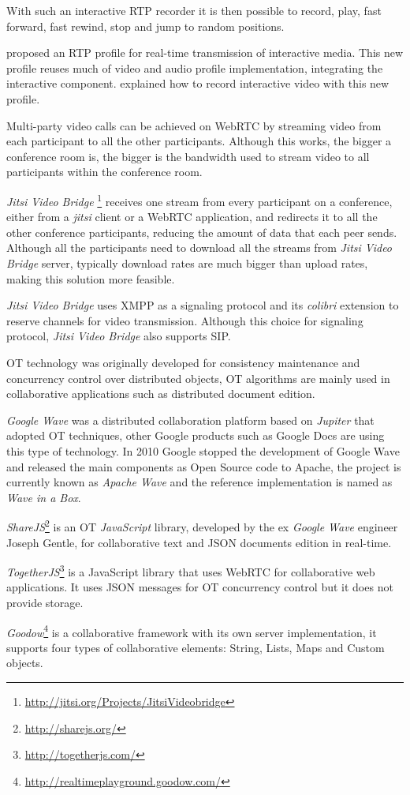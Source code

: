 	With such an interactive \ac{RTP} recorder it is then possible to record, play, fast forward, fast rewind, stop and jump to random positions.

  \cite{interactive_stream} proposed an \ac{RTP} profile for real-time transmission of interactive media. This new profile reuses much of video and audio profile implementation, integrating the interactive component.   \cite{interactive_record} explained how to record interactive video with this new profile.
	
	Multi-party video calls can be achieved on \ac{WebRTC} by streaming video from each participant to all the other participants. Although this works, the bigger a conference room is, the bigger is the bandwidth used to stream video to all participants within the conference room.

	\emph{Jitsi Video Bridge} \footnote{\url{http://jitsi.org/Projects/JitsiVideobridge}} receives one stream from every participant on a conference, either from a \emph{jitsi} client or a \ac{WebRTC} application, and redirects it to all the other conference participants, reducing the amount of data that each peer sends. Although all the participants need to download all the streams from \emph{Jitsi Video Bridge} server, typically download rates are much bigger than upload rates, making this solution more feasible.

	\emph{Jitsi Video Bridge} uses \ac{XMPP} as a signaling protocol and its \emph{colibri} extension \cite{xep0340} to reserve channels for video transmission. Although this choice for signaling protocol, \emph{Jitsi Video Bridge} also supports \ac{SIP}.

	\ac{OT} technology was originally developed for consistency maintenance and concurrency control over distributed objects, \ac{OT} algorithms are mainly used in collaborative applications such as distributed document edition.

	\emph{Google Wave} was a distributed collaboration platform based on \emph{Jupiter}\cite{jupiter} that adopted \ac{OT} techniques, other Google products such as Google Docs are using this type of technology. In 2010 Google stopped the development of Google Wave and released the main components as Open Source code to Apache, the project is currently known as \emph{Apache Wave} and the reference implementation is named as \emph{Wave in a Box}.

	\emph{ShareJS}\footnote{\url{http://sharejs.org/}} is an \ac{OT} \emph{JavaScript} library, developed by the ex \emph{Google Wave} engineer Joseph Gentle, for collaborative text and \ac{JSON} documents edition in real-time.

	\emph{TogetherJS}\footnote{\url{http://togetherjs.com/}} is a JavaScript library that uses \ac{WebRTC} for collaborative web applications. It uses \ac{JSON} messages for \ac{OT} concurrency control but it does not provide storage.

	\emph{Goodow}\footnote{\url{http://realtimeplayground.goodow.com/}} is a collaborative framework with its own server implementation, it supports four types of collaborative elements: String, Lists, Maps and Custom objects.
	
